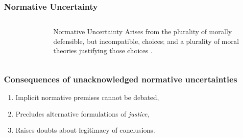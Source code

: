 \begin{frame}
    \frametitle{Normative Uncertainty}


    \begin{columns}
        \column[t]{4cm}
        \begin{figure}
            \centering
        \end{figure}

        \column[t]{6cm}
        \begin{block}{Normative Uncertainty}
            Arises from the plurality of morally defensible, but incompatible, choices;
            and a plurality of moral theories justifying those choices 
            \cite{taebi_governing_2020,van_uffelen_revisiting_2024}.
        \end{block}
        
    \end{columns}

\end{frame}

\begin{frame}
    \frametitle{Consequences of unacknowledged normative uncertainties}

    \begin{enumerate}
        \item Implicit normative premises cannot be debated,
        \item Precludes alternative formulations of \textit{justice},
        \item Raises doubts about legitimacy of conclusions.
    \end{enumerate}

\end{frame}



